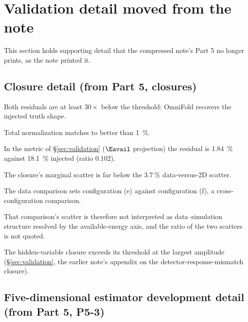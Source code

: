 \section{Validation detail moved from the note}
This section holds supporting detail that the compressed note's Part 5 no longer prints, as the note printed it.

\subsection{Closure detail (from Part 5, closures)}
Both residuals are at least $30\times$ below the threshold: OmniFold recovers the injected truth shape.

Total normalization matches to better than \SI{1}{\percent}.

In the metric of \S\ref{sec:validation} ($\Eavail$ projection) the residual is \SI{1.84}{\percent} against \SI{18.1}{\percent} injected (ratio $0.102$).

The closure's marginal scatter is far below the $\SI{3.7}{\percent}$ data-versus-2D scatter.

The data comparison sets configuration (e) against configuration (f), a cross-configuration comparison.

That comparison's scatter is therefore not interpreted as data--simulation structure resolved by the available-energy axis, and the ratio of the two scatters is not quoted.

The hidden-variable closure exceeds its threshold at the largest amplitude (\S\ref{sec:validation}, the earlier note's appendix on the detector-response-mismatch closure).

\subsection{Five-dimensional estimator development detail (from Part 5, P5-3)}

